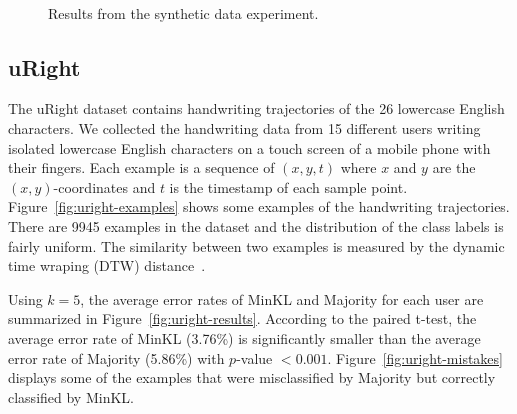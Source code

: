 \documentclass{article}
\begin{document}
\begin{figure}[tb]
\begin{center}
{  \label{fig:synthetic-2}
}\\
\caption{Results from the synthetic data experiment.}
\label{fig:synthetic}
\end{center}
\vskip -0.2in
\end{figure}

\subsection{uRight}
The uRight dataset contains handwriting trajectories of the 26
lowercase English characters.  We collected the handwriting data from
15 different users writing isolated lowercase English characters on a
touch screen of a mobile phone with their fingers. Each example is a
sequence of $(x,y,t)$ where $x$ and $y$ are the $(x,y)$-coordinates
and $t$ is the timestamp of each sample
point. Figure~\ref{fig:uright-examples} shows some examples of the
handwriting trajectories. There are 9945 examples in the dataset and
the distribution of the class labels is fairly uniform. The similarity
between two examples is measured by the dynamic time wraping (DTW)
distance~\cite{Bahlmann2004}.

Using $k = 5$, the average error rates of MinKL and Majority for each
user are summarized in Figure~\ref{fig:uright-results}. According to
the paired t-test, the average error rate of MinKL (3.76\%) is
significantly smaller than the average error rate of Majority (5.86\%)
with $p$-value $ < 0.001$. Figure~\ref{fig:uright-mistakes} displays
some of the examples that were misclassified by Majority but correctly
classified by MinKL.
\end{document}
